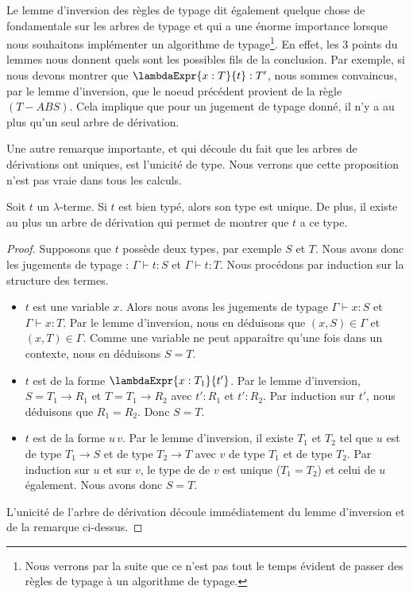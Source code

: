 Le lemme d'inversion des règles de typage dit également quelque chose de
fondamentale sur les arbres de typage et qui a une énorme importance lorsque
nous souhaitons implémenter un algorithme de typage\footnote{Nous verrons par la
suite que ce n'est pas tout le temps évident de passer des règles de typage à un
algorithme de typage.}. En effet, les 3 points du
lemmes nous donnent quels sont les possibles fils de la conclusion. Par
exemple, si nous devons montrer que $\lambdaExpr{x : T}{t} : T'$, nous sommes
convaincus, par le lemme d'inversion, que le noeud précédent provient de la
règle $(T-ABS)$. Cela implique que pour un jugement de typage donné, il n'y a au
plus qu'un seul arbre de dérivation.

Une autre remarque importante, et qui découle du fait que les arbres de
dérivations ont uniques, est l'unicité de type. Nous verrons que cette
proposition n'est pas vraie dans tous les calculs.

\begin{theorem} 
  \label{thm:simply-typed-lambda-calculus-type-unicity}
  Soit $t$ un $\lambda$-terme. Si $t$ est bien typé, alors son type est unique. De plus, il existe au
  plus un arbre de dérivation qui permet de montrer que $t$ a ce type.
\end{theorem}

\begin{proof}
  \label{proof:simply-typed-lambda-calculus-type-unicity}
  Supposons que $t$ possède deux types, par exemple $S$ et $T$. Nous avons donc les
  jugements de typage : $\Gamma \vdash t : S$ et $\Gamma \vdash t : T$. Nous procédons
  par induction sur la structure des termes.
  \begin{itemize}
   \item $t$ est une variable $x$. Alors nous avons les jugements de typage $\Gamma \vdash x : S$ et $\Gamma
     \vdash x : T$. Par le lemme d'inversion, nous en déduisons que $(x, S) \in
     \Gamma$ et $(x, T) \in \Gamma$. Comme une variable ne peut apparaître
     qu'une fois dans un contexte, nous en déduisons $S = T$.

   \item $t$ est de la forme $\lambdaExpr{x : T_{1}}{t'}$. Par le lemme
     d'inversion, $S = T_{1} \rightarrow R_{1}$ et $T = T_{1} \rightarrow
     R_{2}$ avec $t' : R_{1}$ et $t' : R_{2}$. Par induction sur $t'$, nous
     déduisons que $R_{1} = R_{2}$. Donc $S = T$.

   \item $t$ est de la forme $u \, v$. Par le lemme d'inversion, il existe
     $T_{1}$ et $T_{2}$ tel que $u$ est de type $T_{1} \rightarrow S$ et de type $T_{2}
     \rightarrow T$ avec $v$ de type $T_{1}$ et de type $T_{2}$. Par induction
     sur $u$ et sur $v$, le type de de $v$ est unique ($T_{1} = T_{2}$) et celui
     de $u$ également. Nous avons donc $S = T$.
   \end{itemize}

   L'unicité de l'arbre de dérivation découle immédiatement du lemme d'inversion
   et de la remarque ci-dessus.
\end{proof}

